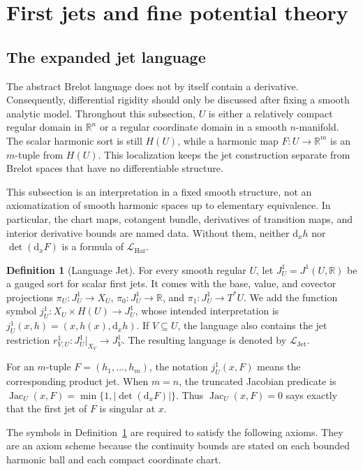 \documentclass{amsart}
\theoremstyle{definition}
\newtheorem{definition}{Definition}[section]
\theoremstyle{remark}
\numberwithin{equation}{section}
\begin{document}
\section{First jets and fine potential theory}

\subsection{The expanded jet language}

The abstract Brelot language does not by itself contain a derivative.
Consequently, differential rigidity should only be discussed after fixing a
smooth analytic model. Throughout this subsection, $U$ is either a relatively
compact regular domain in $\mathbb R^n$ or a regular coordinate domain in a
smooth $n$-manifold. The scalar harmonic sort is still $H(U)$, while a harmonic
map $F:U\to\mathbb R^m$ is an $m$-tuple from $H(U)$. This localization keeps the
jet construction separate from Brelot spaces that have no differentiable
structure.


This subsection is an interpretation in a fixed smooth structure, not an axiomatization of smooth harmonic spaces up to elementary equivalence. In particular, the chart maps, cotangent bundle, derivatives of transition maps, and interior derivative bounds are named data. Without them, neither $\mathrm{d}_xh$ nor $\det(\mathrm{d}_xF)$ is a formula of $\mathcal L_{\mathrm{Har}}$.


\begin{definition}[Language Jet]
\label{def:first-jet-language}
For every smooth regular $U$, let $J^1_U=J^1(U,\mathbb R)$ be a gauged
sort for scalar first jets. It comes with the base, value, and covector
projections $\pi_U:J^1_U\to X_U$, $\pi_0:J^1_U\to\mathbb R$, and
$\pi_1:J^1_U\to T^*U$. We add the function symbol
$j^1_U:X_U\times H(U)\to J^1_U$, whose intended interpretation is
$j^1_U(x,h)=(x,h(x),\mathrm{d}_xh)$. If $V\subseteq U$, the language also contains the
jet restriction $r^1_{V,U}:J^1_U|_{X_V}\to J^1_V$. The resulting language is
denoted by $\mathcal L_{\mathrm{Jet}}$.

For an $m$-tuple $F=(h_1,\ldots,h_m)$, the notation $j^1_U(x,F)$ means the
corresponding product jet. When $m=n$, the truncated Jacobian predicate is
$\operatorname{Jac}_U(x,F)=\min\{1,|\det(\mathrm{d}_xF)|\}$. Thus
$\operatorname{Jac}_U(x,F)=0$ says exactly that the first jet of $F$ is
singular at $x$.
\end{definition}

The symbols in Definition~\ref{def:first-jet-language} are required to satisfy
the following axioms. They are an axiom scheme because the continuity bounds
are stated on each bounded harmonic ball and each compact coordinate chart.
\end{document}
